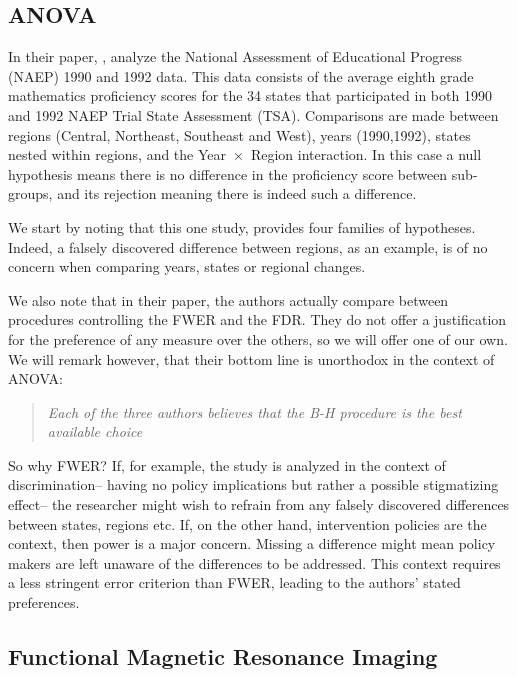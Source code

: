 \documentclass[review,12pt]{article}
\theoremstyle{definition}
\theoremstyle{definition}
\begin{document}
\subsection{\label{sec:anova}ANOVA}
In their \citeyear{williams_controlling_1999} paper, \citeauthor*{williams_controlling_1999}, analyze the National Assessment of Educational Progress (NAEP) 1990 and 1992 data. This data consists of the average eighth grade mathematics proficiency scores for the 34 states that participated in both 1990 and 1992 NAEP Trial State Assessment (TSA). Comparisons are made between regions (Central, Northeast, Southeast and West), years (1990,1992), states nested within regions, and the Year~$\times$~Region interaction. 
In this case a null hypothesis means there is no difference in the proficiency score between sub-groups, and its rejection meaning there is indeed such a difference.

We start by noting that this one study, provides four families of hypotheses. Indeed, a falsely discovered difference between regions, as an example, is of no concern when comparing years, states or regional changes.

We also note that in their paper, the authors actually compare between procedures controlling the FWER and the FDR. They do not offer a justification for the preference of any measure over the others, so we will offer one of our own. We will remark however, that their bottom line is unorthodox in the context of ANOVA: 
\begin{quote}\em 
Each of the three authors believes that the B-H procedure is the best available choice
\end{quote}

So why FWER? If, for example, the study is analyzed in the context of discrimination-- having no policy implications but rather a possible stigmatizing effect-- the researcher might wish to refrain from any falsely discovered differences between states, regions etc. If, on the other hand, intervention policies are the context, then power is a major concern. Missing a difference might mean policy makers are left unaware of the differences to be addressed. This context requires a less stringent error criterion than FWER, leading to the authors' stated preferences.





\subsection{\label{sub:fMRI}Functional Magnetic Resonance Imaging}
\end{document}
